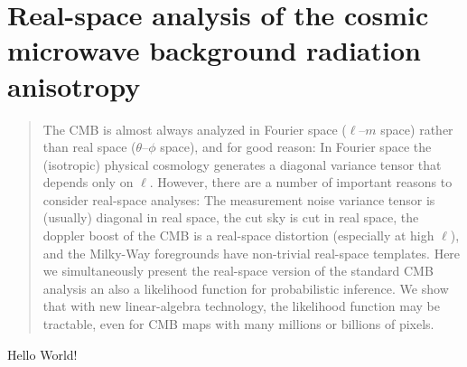 \documentclass[12pt]{article}
\begin{document}
\section*{Real-space analysis of the cosmic microwave background radiation anisotropy}

\begin{abstract}
The CMB is almost always analyzed in Fourier space ($\ell$--$m$ space)
rather than real space ($\theta$--$\phi$ space), and for good reason:
In Fourier space the (isotropic) physical cosmology generates a
diagonal variance tensor that depends only on $\ell$.
However, there are a number of important reasons to consider
real-space analyses:
The measurement noise variance tensor is (usually) diagonal in real
space, the cut sky is cut in real space, the doppler boost of the CMB
is a real-space distortion (especially at high $\ell$), and the
Milky-Way foregrounds have non-trivial real-space templates.
Here we simultaneously present the real-space version of the standard
CMB analysis an also a likelihood function for probabilistic
inference.
We show that with new linear-algebra technology, the likelihood
function may be tractable, even for CMB maps with many millions or
billions of pixels.
\end{abstract}

Hello World!
\end{document}
